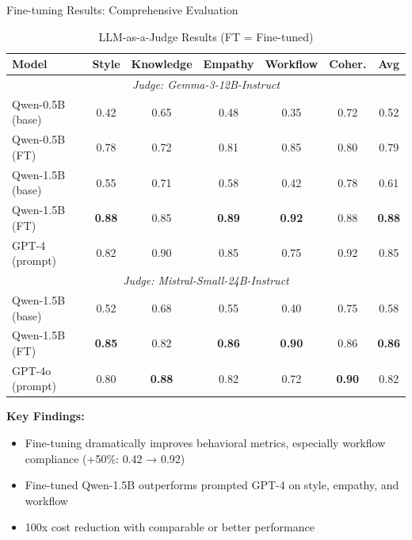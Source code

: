 \documentclass[11pt, aspectratio=169, xcolor=table]{beamer}
\begin{document}
\begin{frame}{Fine-tuning Results: Comprehensive Evaluation}
    \begin{table}[H]
        \centering
        \caption{LLM-as-a-Judge Results (FT = Fine-tuned)}
        \tiny
        \begin{tabular}{|l|c|c|c|c|c|c|}
            \hline
            \textbf{Model} & \textbf{Style} & \textbf{Knowledge} & \textbf{Empathy} & \textbf{Workflow} & \textbf{Coher.} & \textbf{Avg} \\
            \hline
            \multicolumn{7}{|c|}{\textit{Judge: Gemma-3-12B-Instruct}} \\
            \hline
            Qwen-0.5B (base) & 0.42 & 0.65 & 0.48 & 0.35 & 0.72 & 0.52 \\
            Qwen-0.5B (FT) & 0.78 & 0.72 & 0.81 & 0.85 & 0.80 & 0.79 \\
            Qwen-1.5B (base) & 0.55 & 0.71 & 0.58 & 0.42 & 0.78 & 0.61 \\
            \rowcolor{gray!20}
            Qwen-1.5B (FT) & \textbf{0.88} & 0.85 & \textbf{0.89} & \textbf{0.92} & 0.88 & \textbf{0.88} \\
            GPT-4 (prompt) & 0.82 & 0.90 & 0.85 & 0.75 & 0.92 & 0.85 \\
            \hline
            \multicolumn{7}{|c|}{\textit{Judge: Mistral-Small-24B-Instruct}} \\
            \hline
            Qwen-1.5B (base) & 0.52 & 0.68 & 0.55 & 0.40 & 0.75 & 0.58 \\
            \rowcolor{gray!20}
            Qwen-1.5B (FT) & \textbf{0.85} & 0.82 & \textbf{0.86} & \textbf{0.90} & 0.86 & \textbf{0.86} \\
            GPT-4o (prompt) & 0.80 & \textbf{0.88} & 0.82 & 0.72 & \textbf{0.90} & 0.82 \\
            \hline
        \end{tabular}
    \end{table}
    
    \textbf{Key Findings:}
    \begin{itemize}
        \item Fine-tuning dramatically improves behavioral metrics, especially workflow compliance (+50\%: 0.42 → 0.92)
        \item Fine-tuned Qwen-1.5B outperforms prompted GPT-4 on style, empathy, and workflow
        \item 100x cost reduction with comparable or better performance
    \end{itemize}
\end{frame}
\end{document}
